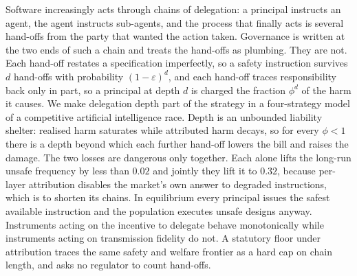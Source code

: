 \noindent
Software increasingly acts through chains of delegation: a principal instructs
an agent, the agent instructs sub-agents, and the process that finally acts is
several hand-offs from the party that wanted the action taken. Governance is
written at the two ends of such a chain and treats the hand-offs as plumbing.
They are not. Each hand-off restates a specification imperfectly, so a safety
instruction survives $d$ hand-offs with probability $(1-\varepsilon)^{d}$, and
each hand-off traces responsibility back only in part, so a principal at depth
$d$ is charged the fraction $\phi^{d}$ of the harm it causes. We make delegation
depth part of the strategy in a four-strategy model of a competitive artificial
intelligence race. Depth is an unbounded liability shelter: realised harm
saturates while attributed harm decays, so for every $\phi<1$ there is a depth
beyond which each further hand-off lowers the bill and raises the damage. The
two losses are dangerous only together. Each alone lifts the long-run unsafe
frequency by less than $0.02$ and jointly they lift it to $0.32$, because
per-layer attribution disables the market's own answer to degraded instructions,
which is to shorten its chains. In equilibrium every principal issues the safest
available instruction and the population executes unsafe designs anyway.
Instruments acting on the incentive to delegate behave monotonically while
instruments acting on transmission fidelity do not. A statutory floor under
attribution traces the same safety and welfare frontier as a hard cap on chain
length, and asks no regulator to count hand-offs.

